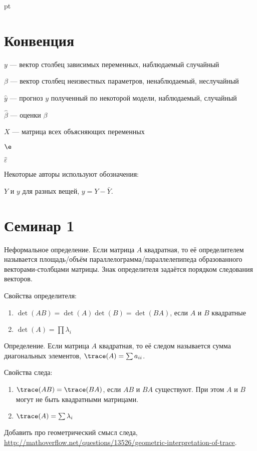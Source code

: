 \documentclass[pdftex,12pt,a4paper]{article}
\def \hb{\hat{\beta}}
\def \hy{\hat{y}}
\def \he{\hat{\varepsilon}}
\begin{document}
 pt %

\listoftodos

\section{Конвенция}


$y$ --- вектор столбец зависимых переменных, наблюдаемый случайный

$\beta$ --- вектор столбец неизвестных параметров, ненаблюдаемый, неслучайный

$\hy$ --- прогноз $y$ полученный по некоторой модели, наблюдаемый, случайный

$\hb$ --- оценки $\beta$

$X$ --- матрица всех объясняющих переменных

$\e$

$\he$


Некоторые авторы используют обозначения:

$Y$ и $y$ для разных вещей, $y=Y-\bar{Y}$.




\section{Семинар 1}

Неформальное определение. Если матрица $A$ квадратная, то её определителем называется площадь/объём параллелограмма/параллелепипеда образованного векторами-столбцами матрицы. Знак определителя задаётся порядком следования векторов. 


Свойства определителя:
\begin{enumerate}
\item $\det(AB)=\det(A)\det(B)=\det(BA)$, если $A$ и $B$ квадратные
\item $\det(A)=\prod \lambda_i$
\end{enumerate}


Определение. Если матрица $A$ квадратная, то её следом называется сумма диагональных элементов, $\trace(A)=\sum a_{ii}$.


Свойства следа:
\begin{enumerate}
\item $\trace(AB)=\trace(BA)$, если $AB$ и $BA$ существуют. При этом $A$ и $B$ могут не быть квадратными матрицами.
\item $\trace(A)=\sum \lambda_i$
\end{enumerate}


Добавить про геометрический смысл следа, \url{http://mathoverflow.net/questions/13526/geometric-interpretation-of-trace}.
\end{document}
